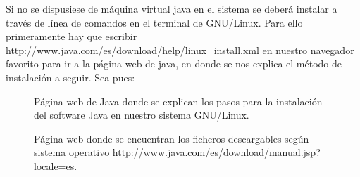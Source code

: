Si no se dispusiese de máquina virtual java en el sistema se deberá instalar a través de línea de comandos en el terminal de GNU/Linux.
Para ello primeramente hay que escribir \url{http://www.java.com/es/download/help/linux_install.xml} en nuestro navegador favorito para ir a la página web de java, en donde se nos explica el método de instalación a seguir. Sea pues:
\newpage
\begin{figure}[H]
\caption{Página web de Java donde se explican los pasos para la instalación del software Java en nuestro sistema GNU/Linux.}
\end{figure}

\begin{figure}[H]
\caption{Página web donde se encuentran los ficheros descargables según sistema operativo \url{http://www.java.com/es/download/manual.jsp?locale=es}.}
\end{figure}

